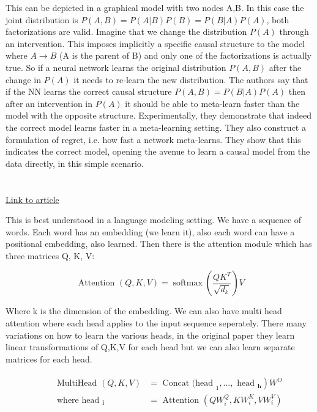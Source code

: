 \documentclass{article}
\newcommand{\citeall}[1]{\citeauthor{#1}}
\begin{document}
This can be depicted in a graphical model with two nodes A,B. In this case the joint distribution is $P(A,B) = P(A|B)P(B) = P(B|A)P(A)$, both factorizations are valid. Imagine that we change the distribution $P(A)$ through an intervention. This imposes implicitly a specific causal structure to the model where $A \rightarrow B$ (A is the parent of B) and only one of the factorizations is actually true. So if a neural network learns the original distribution $P(A,B)$ after the change in $P(A)$ it needs to re-learn the new distribution. The authors say that if the NN learns the correct causal structure $P(A,B) = P(B|A)P(A)$ then after an intervention in $P(A)$ it should be able to meta-learn faster than the model with the opposite structure. Experimentally, they demonstrate that indeed the correct model learns faster in a meta-learning setting. They also construct a formulation of regret, i.e. how fast a network meta-learns. They show that this indicates the correct model, opening the avenue to learn a causal model from the data directly, in this simple scenario.  

\section{\citeall{Vaswani2017AttentionNeed}}

\href{http://www.peterbloem.nl/blog/transformers}{Link to article}

This is best understood in a language modeling setting. We have a sequence of words. Each word has an embedding (we learn it), also each word can have a positional embedding, also learned. Then there is the attention module which has three matrices Q, K, V:

\begin{equation}
\text { Attention }(Q, K, V)=\operatorname{softmax}\left(\frac{Q K^{T}}{\sqrt{d_{k}}}\right) V
\end{equation}

Where k is the dimension of the embedding. We can also have multi head attention where each head applies to the input sequence seperately. There many variations on how to learn the various heads, in the original paper they learn linear transformations of Q,K,V for each head but we can also learn separate matrices for each head.

\begin{equation}
\begin{array}{l}\qquad \begin{aligned} \text { MultiHead }(Q, K, V) &\left.=\text { Concat (head }_{1}, \ldots, \text { head }_{\mathbf{h}}\right) W^{O} \\ \text { where head }_{\mathbf{i}} &=\text { Attention }\left(Q W_{i}^{Q}, K W_{i}^{K}, V W_{i}^{V}\right) \end{aligned} \end{array}
\end{equation}
\end{document}
